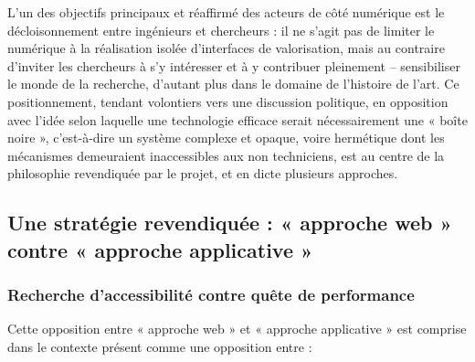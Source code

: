 L’un des objectifs principaux et réaffirmé des acteurs de \pense côté numérique est le décloisonnement entre ingénieurs et chercheurs : il ne s’agit pas de limiter le numérique à la réalisation isolée d’interfaces de valorisation, mais au contraire d’inviter les chercheurs à s’y intéresser et à y contribuer pleinement – sensibiliser le monde de la recherche, d’autant plus dans le domaine de l’histoire de l’art. Ce positionnement, tendant volontiers vers une discussion politique, en opposition avec l’idée selon laquelle une technologie efficace serait nécessairement une « boîte noire », c’est-à-dire un système complexe et opaque, voire hermétique dont les mécanismes demeuraient inaccessibles aux non techniciens, est au centre de la philosophie revendiquée par le projet, et en dicte plusieurs approches. 

\subsection{Une stratégie revendiquée : « approche web » contre « approche applicative »}

\subsubsection{Recherche d’accessibilité contre quête de performance}

Cette opposition entre « approche web » et « approche applicative » est comprise dans le contexte présent comme une opposition entre :  

